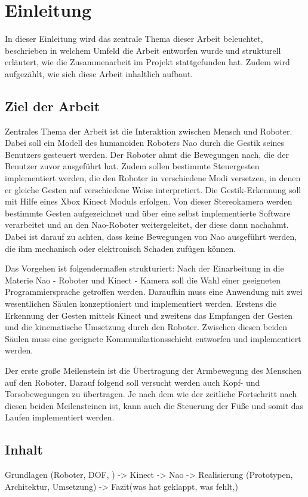 \chapter{Einleitung}      %

In dieser Einleitung wird das zentrale Thema dieser Arbeit beleuchtet, beschrieben in welchem Umfeld die Arbeit entworfen wurde und strukturell erläutert, wie die Zusammenarbeit im Projekt stattgefunden hat. Zudem wird aufgezählt, wie sich diese Arbeit inhaltlich aufbaut.

\section{Ziel der Arbeit}
Zentrales Thema der Arbeit ist die Interaktion zwischen Mensch und Roboter. Dabei soll ein Modell des humanoiden Roboters Nao durch die Gestik seines Benutzers gesteuert werden. Der Roboter ahmt die Bewegungen nach, die der Benutzer zuvor ausgeführt hat. Zudem sollen bestimmte Steuergesten implementiert werden, die den Roboter in verschiedene Modi versetzen, in denen er gleiche Gesten auf verschiedene Weise interpretiert. Die Gestik-Erkennung soll mit Hilfe eines Xbox Kinect Moduls erfolgen. Von dieser Stereokamera werden bestimmte Gesten aufgezeichnet und über eine selbst implementierte Software verarbeitet und an den Nao-Roboter weitergeleitet, der diese dann nachahmt. Dabei ist darauf zu achten, dass keine Bewegungen von Nao ausgeführt werden, die ihm mechanisch oder elektronisch Schaden zufügen können.

Das Vorgehen ist folgendermaßen strukturiert: Nach der Einarbeitung in die Materie Nao - Roboter und Kinect - Kamera soll die Wahl einer geeigneten Programmiersprache getroffen werden. Daraufhin muss eine  Anwendung mit zwei wesentlichen Säulen konzeptioniert und implementiert werden. Erstens die Erkennung der Gesten mittels Kinect und zweitens das Empfangen der Gesten und die kinematische Umsetzung durch den Roboter. Zwischen diesen beiden Säulen muss eine geeignete Kommunikationsschicht entworfen und implementiert werden.

Der erste große Meilenstein ist die Übertragung der Armbewegung des Menschen auf den Roboter. Darauf folgend soll versucht werden auch Kopf- und Torsobewegungen zu übertragen. Je nach dem wie der zeitliche Fortschritt nach diesen beiden Meilensteinen ist, kann auch die Steuerung der Füße und somit das Laufen implementiert werden.


\section{Inhalt}
Grundlagen (Roboter, DOF, ) -> Kinect -> Nao -> Realisierung (Prototypen, Architektur, Umsetzung) -> Fazit(was hat geklappt, was fehlt,)

